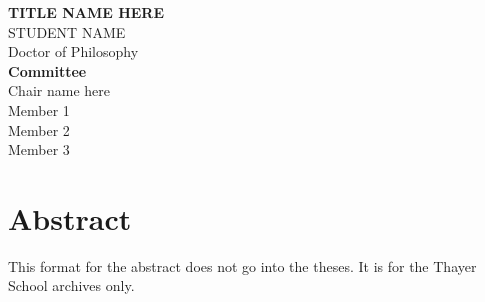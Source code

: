 \pagestyle{plain}
\begin{center}

\textbf{TITLE NAME HERE}\\[1cm]%
STUDENT NAME\\[1cm]
Doctor of Philosophy \\[1cm] %

\textbf{Committee}\\
Chair name here\\
Member 1\\
Member 2\\
Member 3 \\

\section*{Abstract}

This format for the abstract does not go into the theses.  It is for the Thayer School archives only.

\end{center}


\medskip


\cleardoublepage
